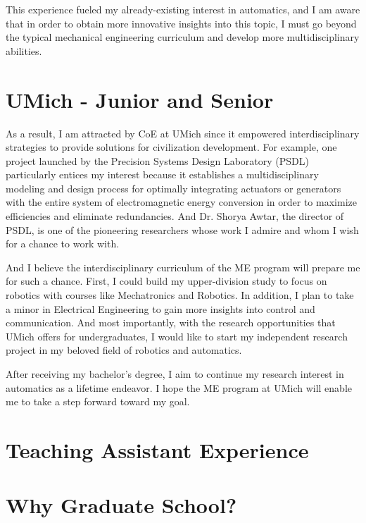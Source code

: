 \documentclass[12pt]{article}
\begin{document}
This experience fueled my already-existing interest in automatics, and I am aware that in order to obtain more innovative insights into this topic, I must go beyond the typical mechanical engineering curriculum and develop more multidisciplinary abilities.

\section {UMich - Junior and Senior}

As a result, I am attracted by CoE at UMich since it empowered interdisciplinary strategies to provide solutions for civilization development. For example, one project launched by the Precision Systems Design Laboratory (PSDL) particularly entices my interest because it establishes a multidisciplinary modeling and design process for optimally integrating actuators or generators with the entire system of electromagnetic energy conversion in order to maximize efficiencies and eliminate redundancies. And Dr. Shorya Awtar, the director of PSDL, is one of the pioneering researchers whose work I admire and whom I wish for a chance to work with. 


And I believe the interdisciplinary curriculum of the ME program will prepare me for such a chance. First, I could build my upper-division study to focus on robotics with courses like Mechatronics and Robotics. In addition, I plan to take a minor in Electrical Engineering to gain more insights into control and communication. And most importantly, with the research opportunities that UMich offers for undergraduates, I would like to start my independent research project in my beloved field of robotics and automatics. 

After receiving my bachelor's degree, I aim to continue my research interest in automatics as a lifetime endeavor. I hope the ME program at UMich will enable me to take a step forward toward my goal. 

\section{Teaching Assistant Experience}

\section{Why Graduate School?}



\end{document}
